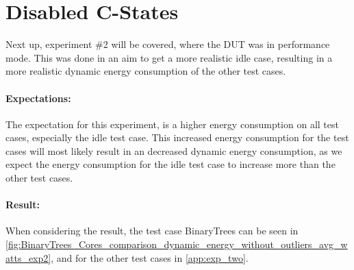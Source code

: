 \section{Disabled C-States}

Next up, experiment \#2 will be covered, where the DUT was in performance mode. This was done in an aim to get a more realistic idle case, resulting in a more realistic dynamic energy consumption of the other test cases.

\paragraph*{Expectations:} The expectation for this experiment, is a higher energy consumption on all test cases, especially the idle test case. This increased energy consumption for the test cases will most likely result in an decreased dynamic energy consumption, as we expect the energy consumption for the idle test case to increase more than the other test cases.

\paragraph*{Result:} When considering the result, the test case BinaryTrees can be seen in \cref{fig:BinaryTrees_Cores_comparison_dynamic_energy_without_outliers_avg_watts_exp2}, and for the other test cases in \cref{app:exp_two}.




